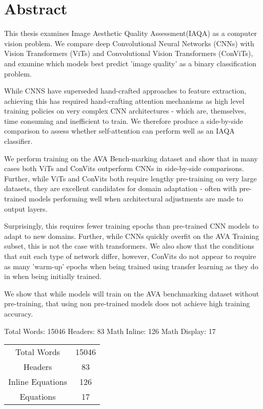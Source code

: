 \chapter*{Abstract}
This thesis examines Image Aesthetic Quality Assessment(IAQA) as a computer vision problem. We compare deep Convolutional Neural Networks (CNNs) with Vision Transformers (ViTs) and Convolutional Vision Transformers (ConViTs), and examine which models best predict 'image quality' as a binary classification problem. 

While CNNS have superseded hand-crafted approaches to feature extraction, achieving this has required hand-crafting attention mechanisms as high level training policies on very complex CNN architectures - which are, themselves, time consuming and inefficient to train. We therefore produce a side-by-side comparison to assess whether self-attention can perform well as an IAQA classifier.  

We perform training on the AVA Bench-marking dataset and show that in many cases both ViTs and ConVits outperform CNNs in side-by-side comparisons. Further, while ViTs and ConVits both require lengthy pre-training on very large datasets, they are excellent candidates for domain adaptation - often with pre-trained models performing well when architectural adjustments are made to output layers. 

Surprisingly, this requires fewer training epochs than pre-trained CNN models to adapt to new domains. Further, while CNNs quickly overfit on the AVA Training subset, this is not the case with transformers. We also show that the conditions that suit each type of network differ, however, ConVits do not appear to require as many 'warm-up' epochs when being trained using transfer learning as they do in when being initially trained. 

We show that while models will train on the AVA benchmarking dataset without pre-training, that using non pre-trained models does not achieve high training accuracy.  
%

Total Words:
15046
Headers:
83
Math Inline:
126
Math Display:
17
\vfill
\begin{flushright}
\begin{longtable}
    \centering
    \begin{tabular}{c|c}
    Total Words & 15046 \\
    Headers & 83 \\
    Inline Equations & 126\\
    Equations & 17\\
    \end{tabular}
    \caption{Caption}
    \label{tab:my_label}
\end{longtable}
\end{flushright}
    

